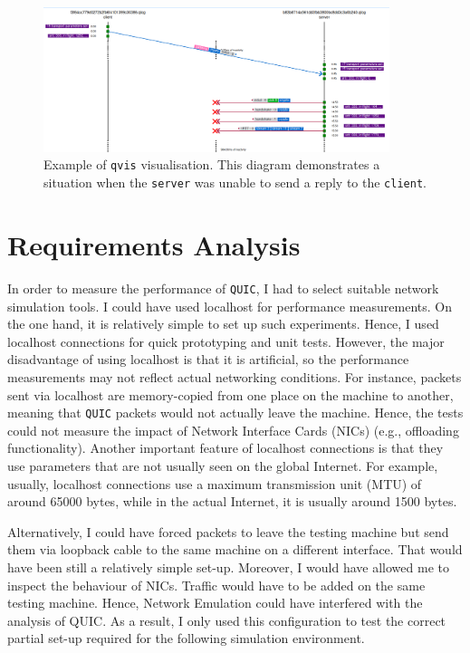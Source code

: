 \documentclass[12pt,a4paper]{report}
\begin{document}
    \begin{figure}[H]
    \centering
    \includegraphics[width=0.9\textwidth]{figs/qvis.png}
    \caption[Example of \texttt{qvis} visualisation]{Example of \texttt{qvis} visualisation. This diagram demonstrates a situation when the \texttt{server} was unable to send a reply to the \texttt{client}.}
    \label{fig:qvis}
    \end{figure}
    



\section{Requirements Analysis}

In order to measure the performance of \texttt{QUIC}, I had to select suitable network simulation tools.
I could have used localhost for performance measurements.
On the one hand, it is relatively simple to set up such experiments.
Hence, I used localhost connections for quick prototyping and unit tests.
However, the major disadvantage of using localhost is that it is artificial, so the performance measurements may not reflect actual networking conditions.
For instance, packets sent via localhost are memory-copied from one place on the machine to another, meaning that \texttt{QUIC} packets would not actually leave the machine.
Hence, the tests could not measure the impact of Network Interface Cards (NICs) (e.g., offloading functionality).
Another important feature of localhost connections is that they use parameters that are not usually seen on the global Internet.
For example, usually, localhost connections use a maximum transmission unit (MTU) of around 65000 bytes, while in the actual Internet, it is usually around 1500 bytes.

 Alternatively, I could have forced packets to leave the testing machine but send them via loopback cable to the same machine on a different interface. 
 That would have been still a relatively simple set-up. 
 Moreover, I would have allowed me to inspect the behaviour of NICs.
 Traffic would have to be added on the same testing machine.
 Hence, Network Emulation could have interfered with the analysis of QUIC.
 As a result, I only used this configuration to test the correct partial set-up required for the following simulation environment.
 
\end{document}
